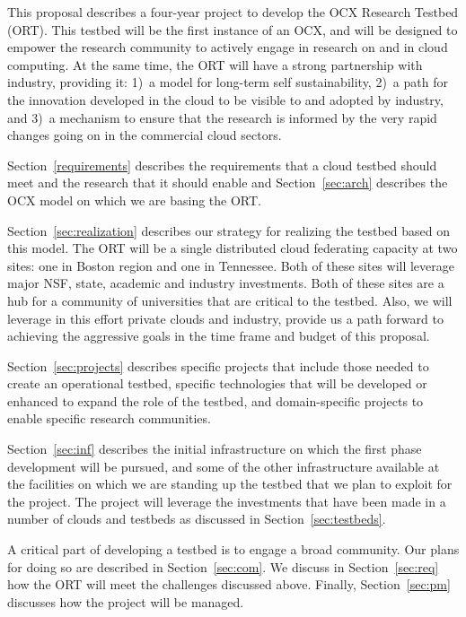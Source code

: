 This proposal describes a four-year project to develop the OCX Research
Testbed (ORT).  This testbed will be the first instance of an OCX, and
will be designed to empower the research community to actively engage
in research on and in cloud computing.  At the same time, the ORT will
have a strong partnership with industry, providing it: 1)~a model for
long-term self sustainability, 2)~a path for the innovation developed in
the cloud to be visible to and adopted by industry, and 3)~a mechanism
to ensure that the research is informed by the very rapid changes
going on in the commercial cloud sectors.  

Section~\ref{requirements} describes the requirements that a cloud
testbed should meet and the research that it should enable and
Section~\ref{sec:arch} describes the OCX model on which we are basing
the ORT.

Section~\ref{sec:realization} describes our strategy for realizing the
testbed based on this model.  The ORT will be a single distributed
cloud federating capacity at two sites: one in Boston region and one
in Tennessee.  Both of these sites will leverage major NSF, state,
academic and industry investments. Both of these sites are a hub for a
community of universities that are critical to the testbed.  Also, we
will leverage in this effort private clouds and industry, provide us a
path forward to achieving the aggressive goals in the time frame and
budget of this proposal.

Section~\ref{sec:projects} describes specific projects that include
those needed to create an operational testbed, specific technologies
that will be developed or enhanced to expand the role of the testbed,
and domain-specific projects to enable specific research communities.

Section~\ref{sec:inf} describes the initial infrastructure on which
the first phase development will be pursued, and some of the other
infrastructure available at the facilities on which we are standing up
the testbed that we plan to exploit for the project.  The project will
leverage the investments that have been made in a number of clouds and
testbeds as discussed in Section~\ref{sec:testbeds}.

A critical part of developing a testbed is to engage a broad
community.  Our plans for doing so are described in
Section~\ref{sec:com}. We discuss in Section~\ref{sec:req} how the ORT
will meet the challenges discussed above.  Finally,
Section~\ref{sec:pm} discusses how the project will be managed. 




